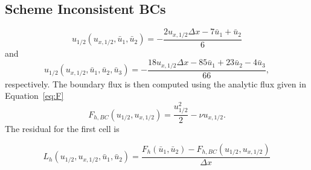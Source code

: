 \documentclass[10pt]{article}%
\begin{document}





\subsection{Scheme Inconsistent BCs}


\[
  u_{1/2}\left(u_{x,1/2}, \bar u_1, \bar u_2 \right) = -\frac{2u_{x,1/2}\Delta x -7 \bar u_1 + \bar u_2}{6}
\]
and
\[
  u_{1/2}(u_{x,1/2}, \bar u_1, \bar u_2, \bar u_3) = -\frac{18 u_{x,1/2}\Delta x - 85 \bar u_1 + 23 \bar u_2 - 4\bar u_3 }{66},
\]
respectively. The boundary flux is then computed using the analytic flux given in Equation~\ref{eq:F}
\[
F_{h,BC}\left(u_{1/2}, u_{x,1/2} \right) 
= \frac{u_{1/2}^2}{2} - \nu u_{x,1/2}.
\]
The residual for the first cell is

\[
  L_h(u_{1/2}, u_{x,1/2},\bar u_{1},\bar u_{2}) = 
    \frac{F_h(\bar u_1, \bar u_2) - F_{h,BC}\left( u_{1/2}, u_{x,1/2}\right)}{\Delta x}
\]




\end{document}
